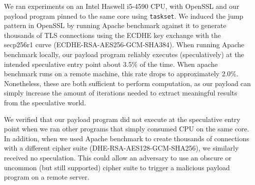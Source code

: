 We ran experiments on an Intel Haswell
i5-4590 CPU, with OpenSSL and our payload program pinned to the same core using
\texttt{taskset}.
We induced the jump pattern in OpenSSL by running Apache benchmark against it to
generate thousands of TLS connections using the ECDHE key exchange with the
secp256r1 curve (ECDHE-RSA-AES256-GCM-SHA384). When running Apache benchmark locally, our payload program
reliably executes (speculatively) at the intended speculative entry point
about 3.5\% of the time. When apache benchmark runs on a remote
machine, this rate drops to approximately 2.0\%. Nonetheless, these are both
sufficient to perform computation, as our payload can simply increase the amount
of iterations needed to extract meaningful results from the speculative world.

We verified that our payload program did not execute at the speculative entry
point when we ran
other programs that simply consumed CPU on the same core. In addition, when we used
Apache benchmark to create thousands of connections with a different cipher
suite (DHE-RSA-AES128-GCM-SHA256), we similarly received no speculation. This
could allow an adversary to use an obscure or uncommon (but still
supported) cipher suite to trigger a malicious \speculake payload program on a remote server.

